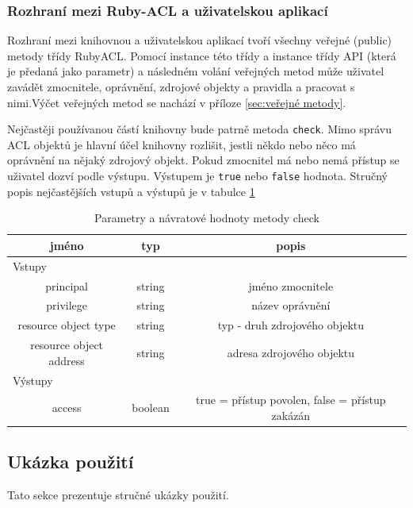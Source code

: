 
\subsubsection{Rozhraní mezi Ruby-ACL a uživatelskou aplikací}
Rozhraní mezi knihovnou a uživatelskou aplikací tvoří všechny veřejné (public) metody třídy RubyACL. Pomocí instance této třídy a instance třídy API (která je předaná jako parametr) a následném volání veřejných metod může uživatel zavádět zmocnitele, oprávnění, zdrojové objekty a pravidla a pracovat s nimi.Výčet veřejných metod se nachází v příloze \ref{sec:veřejné metody}.

Nejčastěji používanou částí knihovny bude patrně metoda \verb|check|. Mimo správu ACL objektů je hlavní účel knihovny rozlišit, jestli někdo nebo něco má oprávnění na nějaký zdrojový objekt. Pokud zmocnitel má nebo nemá přístup se uživatel dozví podle výstupu. Výstupem je \verb|true| nebo \verb|false| hodnota. Stručný popis nejčastějších vstupů a výstupů je v tabulce \ref{tab:tab3}

\begin{table}%
\centering
\begin{tabular}{|c|c|c|}
\hline
\textbf{jméno} & \textbf{typ} & \textbf{popis}\\
\hline
\multicolumn{3}{|l|}{Vstupy} \\
\hline
principal & string & jméno zmocnitele\\
\hline
privilege & string & název oprávnění\\
\hline
resource object type & string & typ - druh zdrojového objektu\\
\hline
resource object address & string & adresa zdrojového objektu\\
\hline
\hline
\multicolumn{3}{|l|}{Výstupy} \\
\hline
access & boolean & true = přístup povolen, false = přístup zakázán\\
\hline
\end{tabular}
\caption{Parametry a návratové hodnoty metody check} %
\label{tab:tab3}
\end{table}


\subsection{Ukázka použití}
Tato sekce prezentuje stručné ukázky použití.

